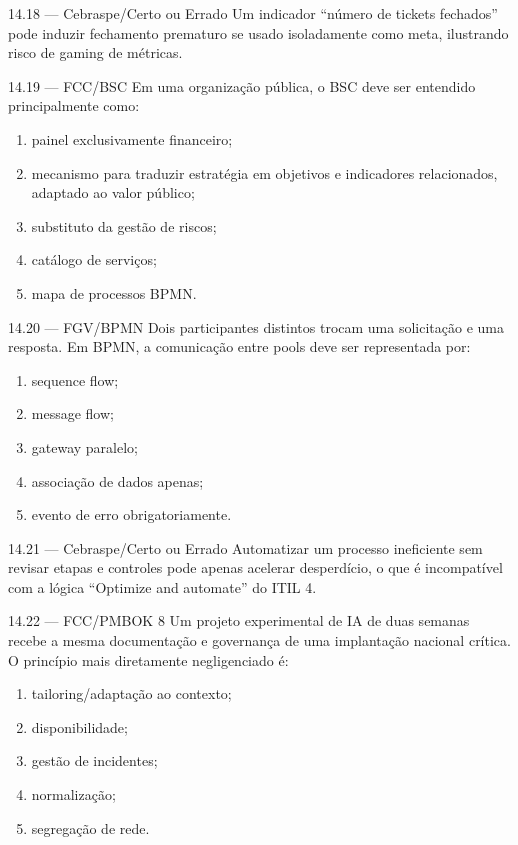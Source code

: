 \begin{questao}{ 14.18 — Cebraspe/Certo ou Errado}
Um indicador ``número de tickets fechados'' pode induzir fechamento prematuro se usado isoladamente como meta, ilustrando risco de gaming de métricas.
\end{questao}

\begin{questao}{ 14.19 — FCC/BSC}
Em uma organização pública, o BSC deve ser entendido principalmente como:
\begin{enumerate}[label=\Alph*)]
\item painel exclusivamente financeiro;
\item mecanismo para traduzir estratégia em objetivos e indicadores relacionados, adaptado ao valor público;
\item substituto da gestão de riscos;
\item catálogo de serviços;
\item mapa de processos BPMN.
\end{enumerate}
\end{questao}

\begin{questao}{ 14.20 — FGV/BPMN}
Dois participantes distintos trocam uma solicitação e uma resposta. Em BPMN, a comunicação entre pools deve ser representada por:
\begin{enumerate}[label=\Alph*)]
\item sequence flow;
\item message flow;
\item gateway paralelo;
\item associação de dados apenas;
\item evento de erro obrigatoriamente.
\end{enumerate}
\end{questao}

\begin{questao}{ 14.21 — Cebraspe/Certo ou Errado}
Automatizar um processo ineficiente sem revisar etapas e controles pode apenas acelerar desperdício, o que é incompatível com a lógica ``Optimize and automate'' do ITIL 4.
\end{questao}

\begin{questao}{ 14.22 — FCC/PMBOK 8}
Um projeto experimental de IA de duas semanas recebe a mesma documentação e governança de uma implantação nacional crítica. O princípio mais diretamente negligenciado é:
\begin{enumerate}[label=\Alph*)]
\item tailoring/adaptação ao contexto;
\item disponibilidade;
\item gestão de incidentes;
\item normalização;
\item segregação de rede.
\end{enumerate}
\end{questao}

